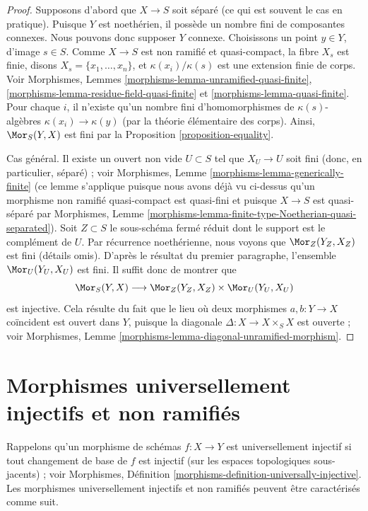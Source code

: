 \begin{proof}
Supposons d'abord que $X \to S$ soit séparé (ce qui est souvent le cas en pratique).
Puisque $Y$ est noethérien, il possède un nombre fini de composantes connexes. Nous
pouvons donc supposer $Y$ connexe. Choisissons un point $y \in Y$, d'image $s \in S$.
Comme $X \to S$ est non ramifié et quasi-compact,
la fibre $X_s$ est finie, disons $X_s = \{x_1, \ldots, x_n\}$,
et $\kappa(x_i)/\kappa(s)$ est une extension finie de corps.
Voir Morphismes, Lemmes \ref{morphisms-lemma-unramified-quasi-finite},
\ref{morphisms-lemma-residue-field-quasi-finite} et
\ref{morphisms-lemma-quasi-finite}.
Pour chaque $i$, il n'existe qu'un nombre fini d'homomorphismes de $\kappa(s)$-algèbres
$\kappa(x_i) \to \kappa(y)$ (par la théorie élémentaire des corps).
Ainsi, $\Mor_S(Y, X)$ est fini par
la Proposition \ref{proposition-equality}.

\medskip\noindent
Cas général. Il existe un ouvert non vide $U \subset S$ tel
que $X_U \to U$ soit fini (donc, en particulier, séparé) ; voir
Morphismes, Lemme \ref{morphisms-lemma-generically-finite}
(ce lemme s'applique puisque nous avons déjà vu ci-dessus qu'un morphisme non ramifié
quasi-compact est quasi-fini et puisque $X \to S$ est quasi-séparé par
Morphismes, Lemme \ref{morphisms-lemma-finite-type-Noetherian-quasi-separated}).
Soit $Z \subset S$ le sous-schéma fermé réduit dont le support est
le complément de $U$. Par récurrence noethérienne, nous voyons que
$\Mor_Z(Y_Z, X_Z)$ est fini (détails omis).
D'après le résultat du premier paragraphe, l'ensemble
$\Mor_U(Y_U, X_U)$ est fini. Il suffit donc de montrer que
$$
\Mor_S(Y, X) \longrightarrow \Mor_Z(Y_Z, X_Z) \times \Mor_U(Y_U, X_U)
$$
est injective. Cela résulte du fait que le lieu où
deux morphismes $a, b : Y \to X$ coïncident est ouvert dans $Y$, puisque
la diagonale $\Delta : X \to X \times_S X$ est ouverte ; voir
Morphismes, Lemme \ref{morphisms-lemma-diagonal-unramified-morphism}.
\end{proof}







\section{Morphismes universellement injectifs et non ramifiés}
\label{section-universally-injective-unramified}

\noindent
Rappelons qu'un morphisme de schémas $f : X \to Y$ est universellement
injectif si tout changement de base de $f$ est injectif (sur les espaces
topologiques sous-jacents) ; voir
Morphismes, Définition \ref{morphisms-definition-universally-injective}.
Les morphismes universellement injectifs et non ramifiés peuvent être
caractérisés comme suit.

